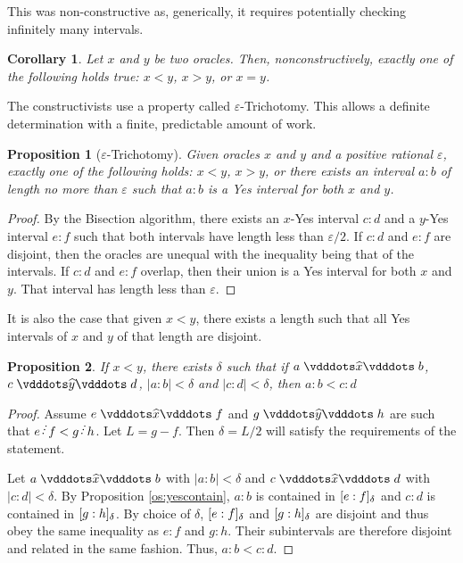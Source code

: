 \documentclass[12pt]{article}
\newtheorem{corollary}{Corollary}[section]
\newtheorem{proposition}{Proposition}[section]
\begin{document}
This was non-constructive as, generically, it requires potentially checking infinitely many intervals. 

\begin{corollary}
    Let $x$ and $y$ be two oracles. Then, nonconstructively, exactly one of the following holds true: $x<y$, $x>y$, or $x=y$.
\end{corollary}

The constructivists use a property called $\varepsilon$-Trichotomy. This allows a definite determination with a finite, predictable amount of work. 

\begin{proposition}[$\varepsilon$-Trichotomy]
    Given oracles $x$ and $y$ and a positive rational $\varepsilon$, exactly one of the following holds: $x<y$, $x>y$, or there exists an interval $a:b$ of length no more than $\varepsilon$ such that $a:b$ is a Yes interval for both $x$ and $y$.
\end{proposition}

\begin{proof}
    By the Bisection algorithm, there exists an $x$-Yes interval $c:d$ and a $y$-Yes interval $e:f$ such that both intervals have length less than $\varepsilon/2$. If $c:d$ and $e:f$ are disjoint, then the oracles are unequal with the inequality being that of the intervals. If $c:d$ and $e:f$ overlap, then their union is a Yes interval for both $x$ and $y$. That interval has length less than $\varepsilon$.
\end{proof}

It is also the case that given $x < y$, there exists a length such that all Yes intervals of $x$ and $y$ of that length are disjoint. 

\begin{proposition}
    If $ x< y$, there exists $\delta$ such that if $a \xora b$, $c \xora[y] d$, $|a:b| < \delta$ and $|c:d| < \delta$, then $a:b < c:d$
\end{proposition}

\begin{proof}
    Assume $e \xora f$ and $g \xora[y] h$ are such that $e\lte f < g \lte h$. Let $L = g-f$. Then $\delta = L/2$ will satisfy the requirements of the statement. 

    Let $a \xora b$ with $|a:b| < \delta$ and $c \xora d$ with $|c:d| < \delta$. By Proposition \ref{os:yescontain}, $a:b$ is contained in $[e:f]_{\delta}$ and $c:d$ is contained in $[g:h]_{\delta}$. By choice of $\delta$, $[e:f]_{\delta}$ and $[g:h]_{\delta}$ are disjoint and thus obey the same inequality as $e:f$ and $g:h$. Their subintervals are therefore disjoint and related in the same fashion. Thus, $a:b < c:d$. 
\end{proof}
\end{document}
